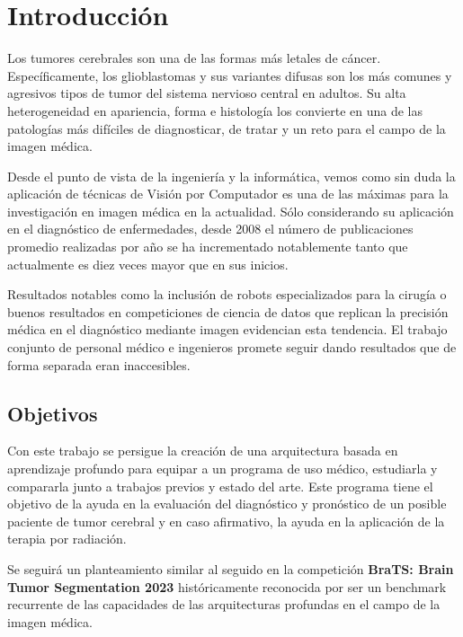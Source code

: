 \chapter{Introducción}

Los tumores cerebrales son una de las formas más letales de cáncer. Específicamente, los glioblastomas y sus variantes difusas son los más comunes y agresivos tipos de tumor del sistema nervioso central en adultos. Su alta heterogeneidad en apariencia, forma e histología los convierte en una de las patologías más difíciles de diagnosticar, de tratar y un reto para el campo de la imagen médica.

Desde el punto de vista de la ingeniería y la informática, vemos como sin duda la aplicación de técnicas de Visión por Computador es una de las máximas para la investigación en imagen médica en la actualidad. Sólo considerando su aplicación en el diagnóstico de enfermedades, desde 2008 el número de publicaciones promedio realizadas por año se ha incrementado notablemente tanto que actualmente es diez veces mayor que en sus inicios. 

Resultados notables como la inclusión de robots especializados para la cirugía \cite{cheng2022vinci} o buenos resultados en competiciones de ciencia de datos que replican la precisión médica en el diagnóstico mediante imagen \cite{bulten2022artificial} evidencian esta tendencia. El trabajo conjunto de personal médico e ingenieros promete seguir dando resultados que de forma separada eran inaccesibles.



\section{Objetivos}


Con este trabajo se persigue la creación de una arquitectura basada en aprendizaje profundo para equipar a un programa de uso médico, estudiarla y compararla junto a trabajos previos y estado del arte. Este programa tiene el objetivo de la ayuda en la evaluación del diagnóstico y pronóstico de un posible paciente de tumor cerebral y en caso afirmativo, la ayuda en la aplicación de la terapia por radiación. 

Se seguirá un planteamiento similar al seguido en la competición \textbf{BraTS: Brain Tumor Segmentation 2023} \cite{baid2021rsna} históricamente reconocida por ser un benchmark recurrente de las capacidades de las arquitecturas profundas en el campo de la imagen médica.

